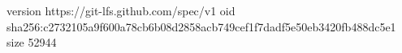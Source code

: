 version https://git-lfs.github.com/spec/v1
oid sha256:c2732105a9f600a78cb6b08d2858acb749cef1f7dadf5e50eb3420fb488dc5e1
size 52944
